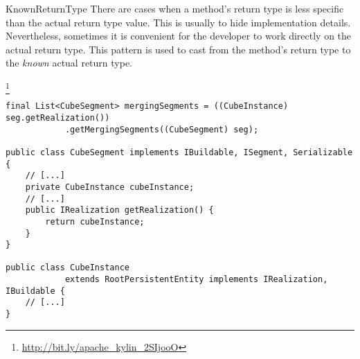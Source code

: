 \begin{pattern}{KnownReturnType}
There are cases when a method's return type is less specific than the
actual return type value.
This is usually to hide implementation details.
Nevertheless, sometimes it is convenient for the developer to work
directly on the actual return type.
This pattern is used to cast from the method's return type to
the \emph{known} actual return type.
%
%

\instances{}

\footnote{\url{http://bit.ly/apache_kylin_2SIjooO}}

\begin{verbatim}
final List<CubeSegment> mergingSegments = ((CubeInstance) seg.getRealization())
            .getMergingSegments((CubeSegment) seg);

public class CubeSegment implements IBuildable, ISegment, Serializable {
    // [...]
    private CubeInstance cubeInstance;
    // [...]
    public IRealization getRealization() {
        return cubeInstance;
    }
}

public class CubeInstance
            extends RootPersistentEntity implements IRealization, IBuildable {
    // [...]
}
\end{verbatim}

\detection{}

\discussion{}

\related{}

\end{pattern}